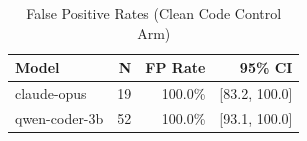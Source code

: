 \begin{table}[h]
\centering
\caption{False Positive Rates (Clean Code Control Arm)}
\label{tab:false_positives}
\begin{tabular}{lrrr}
\toprule
Model & N & FP Rate & 95\% CI \\
\midrule
claude-opus & 19 & 100.0\% & [83.2, 100.0] \\
qwen-coder-3b & 52 & 100.0\% & [93.1, 100.0] \\
\bottomrule
\end{tabular}
\end{table}